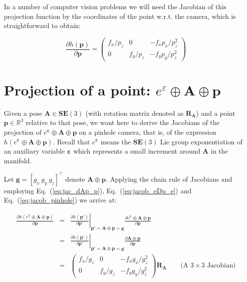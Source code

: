 \documentclass[a4paper,11pt]{report}
\newcommand{\E}{{\bm{\varepsilon}}}
\newcommand{\A}{{\mathbf{A}}}
\begin{document}
In a number of computer vision problems we will need the Jacobian of this
projection function by the coordinates of the point w.r.t. the camera, which 
is straightforward to obtain:

\begin{equation}
\label{eq:jacob_pinhole}
\frac{\partial h(\mathbf{p})}{\partial \mathbf{p}} = 
\left(
\begin{array}{ccc}
 f_x/p_z  &    0    &  -f_x p_x/p_z^2   \\
 0 & f_y/p_z  &  -f_y p_y/ p_z^2   
\end{array}
\right)
\end{equation}


\section{Projection of a point: $e^\varepsilon \oplus \mathbf{A} \oplus \mathbf{p}$}

Given a pose $\mathbf{A} \in \mathbf{SE}(3)$ 
(with rotation matrix denoted as $\mathbf{R_A}$)
and a point 
$\mathbf{p} \in \mathbb{R}^3$
relative to that pose, we want here to derive the Jacobians of 
the projection of $e^\E \oplus \A \oplus \mathbf{p}$ on a pinhole camera, that is, 
of the expression $h(e^\E \oplus \A \oplus \mathbf{p})$.
Recall that $e^\E$ means the $\mathbf{SE}(3)$ Lie group exponentiation 
of an auxiliary variable $\E$ which represents a small increment around $\A$ in the manifold.

Let $\mathbf{g}=[g_x ~ g_y ~ g_z]^\top$ denote $\mathbf{A} \oplus \mathbf{p}$.
Applying the chain rule of Jacobians and employing Eq.~(\ref{eq:jac_dAp_p}), 
Eq.~(\ref{eq:jacob_eDp_e}) 
and  Eq.~(\ref{eq:jacob_pinhole})
we arrive at:

\begin{eqnarray}
\frac{\partial h(e^\E \oplus \A \oplus \mathbf{p})}{\partial \mathbf{p}} 
&=& 
\left. \frac{\partial h(\mathbf{p'})}{\partial \mathbf{p'}} \right|_{ \mathbf{p'} = \A \oplus \mathbf{p} = \mathbf{g} }
\frac{\partial e^\E \oplus \A \oplus \mathbf{p} }{\partial \mathbf{p}} \\
&=& 
\left. \frac{\partial h(\mathbf{p'})}{\partial \mathbf{p'}} \right|_{ \mathbf{p'} = \A \oplus \mathbf{p} = \mathbf{g} }
\frac{\partial \A \oplus \mathbf{p} }{\partial \mathbf{p}} \\
&=& 
\left(
\begin{array}{ccc}
 f_x / g_z   &    0    &  -f_x g_x / g_z^2   \\
 0 & f_y / g_z  &  -f_y g_y / g_z^2   
\end{array}
\right)
\mathbf{R_A} 
\quad\quad \text{(A $3 \times 3$ Jacobian)}
\end{eqnarray}
\end{document}
